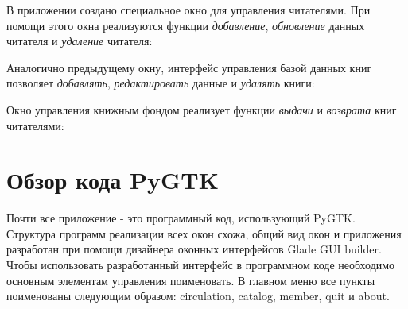 \documentclass[a4paper,openany,twoside,final]{book}
\begin{document}
В приложении создано специальное окно для управления читателями.  При
помощи этого окна реализуются функции \emph{добавление}, \emph{обновление}
данных читателя и \emph{удаление} читателя:

\noindent{}

Аналогично предыдущему окну, интерфейс управления базой данных книг
позволяет \emph{добавлять}, \emph{редактировать} данные и \emph{удалять} книги:

\noindent{}

Окно управления книжным фондом реализует функции \emph{выдачи} и \emph{возврата}
книг читателями:

\noindent{}


\section{Обзор кода PyGTK%
  \label{pygtk}%
}

Почти все приложение - это программный код, использующий PyGTK.
Структура программ реализации всех окон схожа, общий вид окон и
приложения разработан при помощи дизайнера оконных интерфейсов Glade
GUI builder.  Чтобы использовать разработанный интерфейс в программном
коде необходимо основным элементам управления поименовать.  В главном
меню все пункты поименованы следующим образом: \textquotedbl{}circulation\textquotedbl{},
\textquotedbl{}catalog\textquotedbl{}, \textquotedbl{}member\textquotedbl{}, \textquotedbl{}quit\textquotedbl{} и \textquotedbl{}about\textquotedbl{}.
\end{document}
